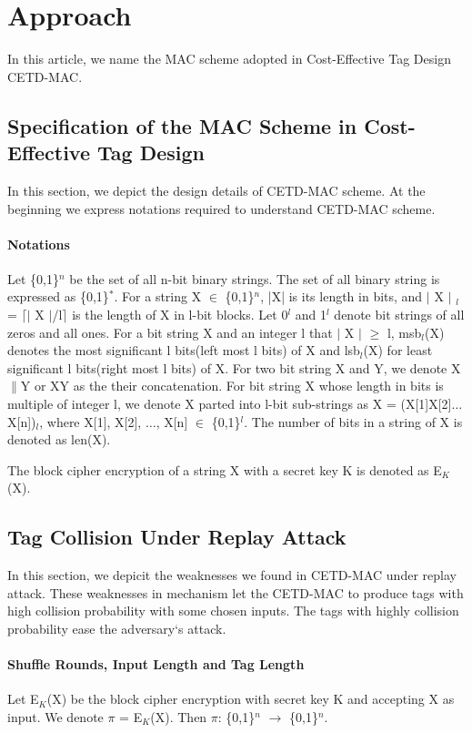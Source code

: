 \documentclass{article}
\begin{document}
\section{Approach}
In this article, we name the MAC scheme adopted in Cost-Effective Tag Design\cite{} CETD-MAC. 
\subsection{Specification of the MAC Scheme in Cost-Effective Tag Design}
In this section, we depict the design details of CETD-MAC scheme. At the beginning we express notations required to understand CETD-MAC scheme. 
\paragraph{Notations}
Let \{0,1\}$^n$ be the set of all n-bit binary strings. The set of all binary string is expressed as \{0,1\}$^*$.  
For a string X $\in$ \{0,1\}$^n$, |X| is its length in bits, and $\vert$ X $\vert$ $_l$ = $\lceil$$\vert$ X $\vert$/l$\rceil$ is the length of X in l-bit blocks.  Let 0$^l$ and 1$^l$ denote bit strings of all zeros and all ones. 
For a bit string X and an integer l that $\vert$ X $\vert$ $\geq$ l, msb$_l$(X) denotes the most significant l bits(left most l bits) of X and lsb$_l$(X) for least significant l bits(right most l bits) of X.
For two bit string X and Y, we denote X$\|$Y  or XY as the their concatenation. For bit string X whose length in bits is multiple of integer l, we denote X parted into l-bit sub-strings as X = (X[1]X[2]$\ldots$X[n])$_l$, where X[1], X[2], $\ldots$, X[n] $\in$ \{0,1\}$^l$.
The number of bits in a string of X is denoted as len(X).

The block cipher encryption of a string X with a secret key K is denoted as E$_K$(X). 
\subsection{Tag Collision Under Replay Attack}
In this section, we depicit the weaknesses we found in CETD-MAC under replay attack. These weaknesses in mechanism let the CETD-MAC to produce tags with high collision probability with some chosen inputs. The tags with highly collision probability ease the adversary`s attack.
\paragraph{Shuffle Rounds, Input Length and Tag Length}
Let E$_K$(X) be the block cipher encryption with secret key K and accepting X as input. We denote $\pi$ = E$_K$(X). Then $\pi$: \{0,1\}$^n$ $\rightarrow$
\{0,1\}$^n$.
\end{document}
